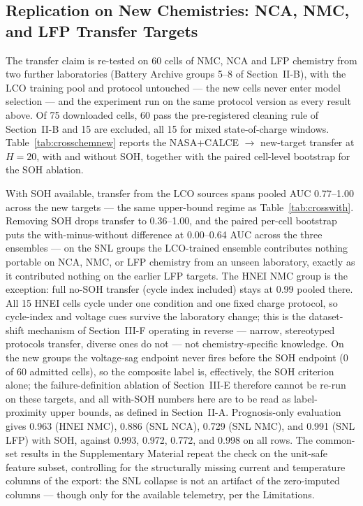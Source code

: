 \subsection{Replication on New Chemistries: NCA, NMC, and LFP Transfer Targets}
The transfer claim is re-tested on 60 cells of NMC, NCA and LFP chemistry from two further laboratories (Battery Archive groups 5--8 of Section~II-B), with the LCO training pool and protocol untouched --- the new cells never enter model selection --- and the experiment run on the same protocol version as every result above. Of 75 downloaded cells, 60 pass the pre-registered cleaning rule of Section~II-B and 15 are excluded, all 15 for mixed state-of-charge windows. Table~\ref{tab:crosschemnew} reports the NASA+CALCE $\rightarrow$ new-target transfer at $H{=}20$, with and without SOH, together with the paired cell-level bootstrap for the SOH ablation.

With SOH available, transfer from the LCO sources spans pooled AUC 0.77--1.00 across the new targets --- the same upper-bound regime as Table~\ref{tab:crosswith}. Removing SOH drops transfer to 0.36--1.00, and the paired per-cell bootstrap puts the with-minus-without difference at 0.00--0.64 AUC across the three ensembles --- on the SNL groups the LCO-trained ensemble contributes nothing portable on NCA, NMC, or LFP chemistry from an unseen laboratory, exactly as it contributed nothing on the earlier LFP targets. The HNEI NMC group is the exception: full no-SOH transfer (cycle index included) stays at 0.99 pooled there. All 15 HNEI cells cycle under one condition and one fixed charge protocol, so cycle-index and voltage cues survive the laboratory change; this is the dataset-shift mechanism of Section~III-F operating in reverse --- narrow, stereotyped protocols transfer, diverse ones do not --- not chemistry-specific knowledge. On the new groups the voltage-sag endpoint never fires before the SOH endpoint (0 of 60 admitted cells), so the composite label is, effectively, the SOH criterion alone; the failure-definition ablation of Section~III-E therefore cannot be re-run on these targets, and all with-SOH numbers here are to be read as label-proximity upper bounds, as defined in Section~II-A. Prognosis-only evaluation gives 0.963 (HNEI NMC), 0.886 (SNL NCA), 0.729 (SNL NMC), and 0.991 (SNL LFP) with SOH, against 0.993, 0.972, 0.772, and 0.998 on all rows. The common-set results in the Supplementary Material repeat the check on the unit-safe feature subset, controlling for the structurally missing current and temperature columns of the export: the SNL collapse is not an artifact of the zero-imputed columns --- though only for the available telemetry, per the Limitations.

